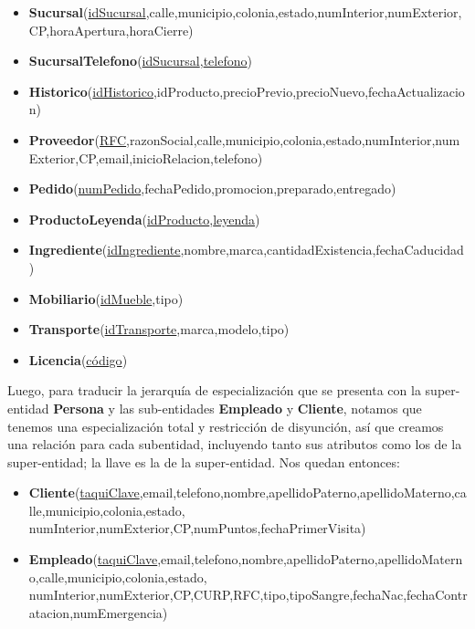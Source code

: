 \documentclass[11pt,letterpaper]{article}
\begin{document}
\begin{itemize}
\item {\footnotesize \textbf{Sucursal}(\underline{idSucursal},calle,municipio,colonia,estado,numInterior,numExterior,CP,horaApertura,horaCierre)}
\item \footnotesize{\textbf{SucursalTelefono}(\underline{idSucursal},\underline{telefono})}
\item \footnotesize{\textbf{Historico}(\underline{idHistorico},idProducto,precioPrevio,precioNuevo,fechaActualizacion)}
\item \scriptsize{\textbf{Proveedor}(\underline{RFC},razonSocial,calle,municipio,colonia,estado,numInterior,numExterior,CP,email,inicioRelacion,telefono)}
\item \footnotesize{\textbf{Pedido}(\underline{numPedido},fechaPedido,promocion,preparado,entregado)}
\item \footnotesize{\textbf{ProductoLeyenda}(\underline{idProducto},\underline{leyenda})}
\item \footnotesize{\textbf{Ingrediente}(\underline{idIngrediente},nombre,marca,cantidadExistencia,fechaCaducidad)}
\item \footnotesize{\textbf{Mobiliario}(\underline{idMueble},tipo)}
\item \footnotesize{\textbf{Transporte}(\underline{idTransporte},marca,modelo,tipo)}
\item \footnotesize{\textbf{Licencia}(\underline{código})}
\end{itemize}

Luego, para traducir la jerarquía de especialización que se presenta con la super-entidad \textbf{Persona} y las sub-entidades \textbf{Empleado} y \textbf{Cliente}, notamos que tenemos una especialización total y restricción de disyunción, así que creamos una relación para cada subentidad, incluyendo tanto sus atributos como los de la super-entidad; la llave es la de la super-entidad. Nos quedan entonces:

\begin{itemize}
\item \footnotesize{\textbf{Cliente}(\underline{taquiClave},email,telefono,nombre,apellidoPaterno,apellidoMaterno,calle,municipio,colonia,estado,
numInterior,numExterior,CP,numPuntos,fechaPrimerVisita)}
\item \footnotesize{\textbf{Empleado}(\underline{taquiClave},email,telefono,nombre,apellidoPaterno,apellidoMaterno,calle,municipio,colonia,estado,
numInterior,numExterior,CP,CURP,RFC,tipo,tipoSangre,fechaNac,fechaContratacion,numEmergencia)}
\end{itemize}
\end{document}
